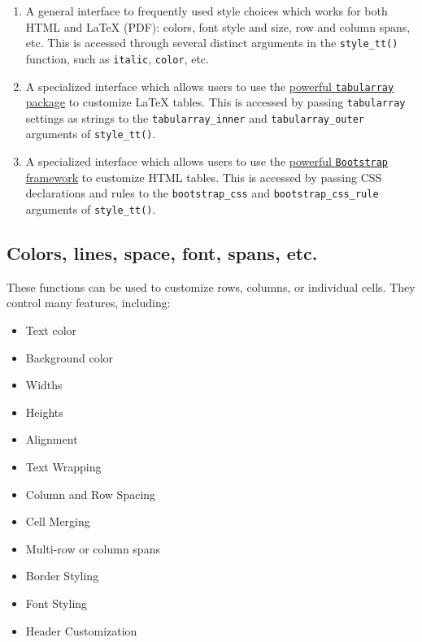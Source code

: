 \documentclass[
  letterpaper,
  DIV=11,
  numbers=noendperiod]{scrartcl}
\providecommand{\tightlist}{%
  \setlength{\itemsep}{0pt}\setlength{\parskip}{0pt}}\usepackage{longtable,booktabs,array}
\begin{document}
\begin{enumerate}
\def\labelenumi{\arabic{enumi}.}
\tightlist
\item
  A general interface to frequently used style choices which works for
  both HTML and LaTeX (PDF): colors, font style and size, row and column
  spans, etc. This is accessed through several distinct arguments in the
  \texttt{style\_tt()} function, such as \texttt{italic},
  \texttt{color}, etc.
\item
  A specialized interface which allows users to use the
  \href{https://ctan.org/pkg/tabularray?lang=en}{powerful
  \texttt{tabularray} package} to customize LaTeX tables. This is
  accessed by passing \texttt{tabularray} settings as strings to the
  \texttt{tabularray\_inner} and \texttt{tabularray\_outer} arguments of
  \texttt{style\_tt()}.
\item
  A specialized interface which allows users to use the
  \href{https://getbootstrap.com/docs/5.3/content/tables/}{powerful
  \texttt{Bootstrap} framework} to customize HTML tables. This is
  accessed by passing CSS declarations and rules to the
  \texttt{bootstrap\_css} and \texttt{bootstrap\_css\_rule} arguments of
  \texttt{style\_tt()}.
\end{enumerate}

\subsection{Colors, lines, space, font, spans,
etc.}\label{colors-lines-space-font-spans-etc.}

These functions can be used to customize rows, columns, or individual
cells. They control many features, including:

\begin{itemize}
\tightlist
\item
  Text color
\item
  Background color
\item
  Widths
\item
  Heights
\item
  Alignment
\item
  Text Wrapping
\item
  Column and Row Spacing
\item
  Cell Merging
\item
  Multi-row or column spans
\item
  Border Styling
\item
  Font Styling
\item
  Header Customization
\end{itemize}
\end{document}
